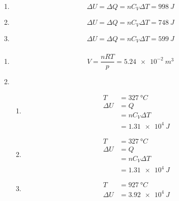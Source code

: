 \documentclass{article}
\begin{document}
\subsubsection{}

\begin{enumerate}
  \item \[\Delta U = \Delta Q = n C_V \Delta T = \qty{998}{J}\]

  \item \[\Delta U = \Delta Q = n C_V \Delta T = \qty{748}{J}\]

  \item \[\Delta U = \Delta Q = n C_V \Delta T = \qty{599}{J}\]
\end{enumerate}

\subsubsection{}

\begin{enumerate}
  \item \[V = \frac{n R T}{p} = \qty{5.24e-2}{m^3}\]

  \item

        \begin{enumerate}
          \item

                \begin{align*}
                  T        & = \qty{327}{\degree C} \\
                  \Delta U & = Q                    \\
                           & = n C_V \Delta T       \\
                           & = \qty{1.31e4}{J}
                \end{align*}

          \item

                \begin{align*}
                  T        & = \qty{327}{\degree C} \\
                  \Delta U & = Q                    \\
                           & = n C_V \Delta T       \\
                           & = \qty{1.31e4}{J}
                \end{align*}

          \item

                \begin{align*}
                  T        & = \qty{927}{\degree C} \\
                  \Delta U & = \qty{3.92e4}{J}
                \end{align*}
        \end{enumerate}
\end{enumerate}
\end{document}

